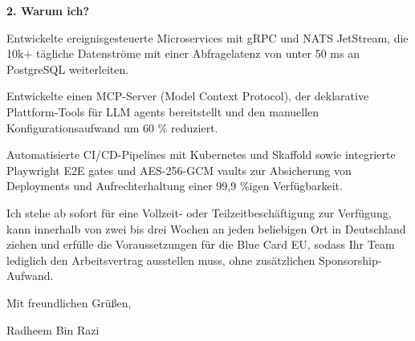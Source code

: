 \documentclass[11pt,a4paper]{coverletter}
\begin{document}
\vspace{8pt}\noindent\textbf{2. Warum ich?}\par\vspace{3pt}

\bullets

  \item Entwickelte ereignisgesteuerte Microservices mit gRPC und NATS JetStream, die 10k+ tägliche Datenströme mit einer Abfragelatenz von unter 50 ms an PostgreSQL weiterleiten.

  \item Entwickelte einen MCP-Server (Model Context Protocol), der deklarative Plattform-Tools für LLM agents bereitstellt und den manuellen Konfigurationsaufwand um 60 \% reduziert.

  \item Automatisierte CI/CD-Pipelines mit Kubernetes und Skaffold sowie integrierte Playwright E2E gates und AES-256-GCM vaults zur Absicherung von Deployments und Aufrechterhaltung einer 99,9 \%igen Verfügbarkeit.

\bulletsend

Ich stehe ab sofort für eine Vollzeit- oder Teilzeitbeschäftigung zur Verfügung, kann innerhalb von zwei bis drei Wochen an jeden beliebigen Ort in Deutschland ziehen und erfülle die Voraussetzungen für die Blue Card EU, sodass Ihr Team lediglich den Arbeitsvertrag ausstellen muss, ohne zusätzlichen Sponsorship-Aufwand.

\closing{Mit freundlichen Grüßen,}{Radheem Bin Razi}
\end{document}
